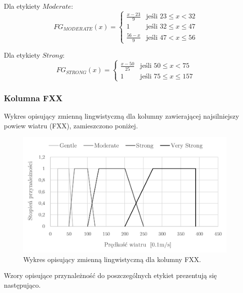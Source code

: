 \documentclass{classrep}
\begin{document}
Dla etykiety $Moderate$:
\begin{equation}
{FG}_{MODERATE}(x)= \left\{ \begin{array}{ll}
\frac{x-23}{9} 	& \textrm{jeśli $23 \leq x < 32$} \\
1 			& \textrm{jeśli $32 \leq x \leq 47$} \\
\frac{56-x}{9} 	& \textrm{jeśli $47 < x \leq 56$}
\end{array} \right.
\end{equation}

Dla etykiety $Strong$:
\begin{equation}
{FG}_{STRONG}(x)= \left\{ \begin{array}{ll}
\frac{x-50}{25} 	 & \textrm{jeśli $50 \leq x < 75$} \\
1 			 & \textrm{jeśli $75 \leq x \leq 157$}
\end{array} \right.
\end{equation}

\clearpage



\subsubsection{Kolumna FXX}
Wykres opisujący zmienną lingwistyczną dla kolumny zawierającej najsilniejszy powiew wiatru (FXX), zamieszczono poniżej.
\begin{figure}[H]
	\centering
	\includegraphics[width=0.99\textwidth]{Pictures/TermsCharts/FXX.png}
	\caption{Wykres opisujący zmienną lingwistyczną dla kolumny FXX.}
\end{figure}

Wzory opisujące przynależność do poszczególnych etykiet prezentują się następująco. \newline
\end{document}
